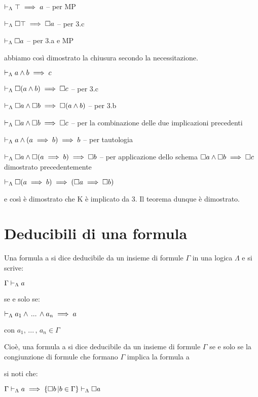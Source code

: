 $\vdash_{\Lambda}\top\implies a$ -- per MP

$\vdash_{\Lambda}\square\top\implies\square a$ -- per 3.c

$\vdash_{\Lambda}\square a$ -- per 3.a e MP

abbiamo così dimostrato la chiusura secondo la necessitazione.

$\vdash_{\Lambda}a\wedge b\implies c$

$\vdash_{\Lambda}\square(a\wedge b)\implies\square c$ -- per 3.c

$\vdash_{\Lambda}\square a\wedge\square b\implies\square(a\wedge b)$ --
per 3.b

$\vdash_{\Lambda}\square a\wedge\square b\implies\square c$ -- per la combinazione
delle due implicazioni precedenti

$\vdash_{\Lambda}a\wedge(a\implies b)\implies b$ -- per tautologia

$\vdash_{\Lambda}\square a\wedge\square(a\implies b)\implies\square b$
-- per applicazione dello schema $\square a\wedge\square b\implies\square c$
dimostrato precedentemente

$\vdash_{\Lambda}\square(a\implies b)\implies(\square a\implies\square b)$

e così è dimostrato che K è implicato da 3. Il teorema dunque è dimostrato.


\section{Deducibili di una formula}

Una formula a si dice deducibile da un insieme di formule $\Gamma$
in una logica $\Lambda$ e si scrive:

$\Gamma\vdash_{\Lambda}a$

se e solo se:

$\vdash_{\Lambda}a_{1}\wedge\,...\,\wedge a_{n}\implies a$

con $a_{1},\,...\,,\, a_{n}\in\Gamma$

Cioè, una formula a si dice deducibile da un insieme di formule $\Gamma$
se e solo se la congiunzione di formule che formano $\Gamma$ implica
la formula a

si noti che:

$\Gamma\vdash_{\Lambda}a\implies\{\square b\,|b\in\Gamma\}\vdash_{\Lambda}\square a$
